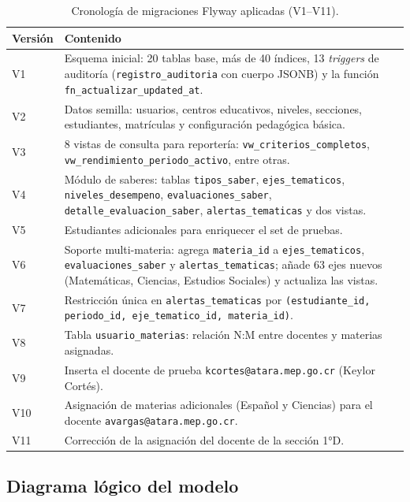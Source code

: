 \documentclass[11pt,a4paper,oneside]{article}
\newcommand{\code}[1]{\texttt{\small #1}}
\begin{document}
\begin{table}[h]
\centering
\renewcommand{\arraystretch}{1.15}
\begin{tabular}{@{}p{1.0cm} p{12.5cm}@{}}
\toprule
\textbf{Versión} & \textbf{Contenido} \\
\midrule
V1  & Esquema inicial: 20 tablas base, más de 40 índices, 13 \emph{triggers} de auditoría
       (\code{registro\_auditoria} con cuerpo JSONB) y la función
       \code{fn\_actualizar\_updated\_at}. \\
V2  & Datos semilla: usuarios, centros educativos, niveles, secciones, estudiantes,
       matrículas y configuración pedagógica básica. \\
V3  & 8 vistas de consulta para reportería:
       \code{vw\_criterios\_completos}, \code{vw\_rendimiento\_periodo\_activo},
       entre otras. \\
V4  & Módulo de saberes: tablas \code{tipos\_saber}, \code{ejes\_tematicos},
       \code{niveles\_desempeno}, \code{evaluaciones\_saber},
       \code{detalle\_evaluacion\_saber}, \code{alertas\_tematicas} y dos vistas. \\
V5  & Estudiantes adicionales para enriquecer el set de pruebas. \\
V6  & Soporte multi-materia: agrega \code{materia\_id} a \code{ejes\_tematicos},
       \code{evaluaciones\_saber} y \code{alertas\_tematicas}; añade 63 ejes nuevos
       (Matemáticas, Ciencias, Estudios Sociales) y actualiza las vistas. \\
V7  & Restricción única en \code{alertas\_tematicas} por
       \code{(estudiante\_id, periodo\_id, eje\_tematico\_id, materia\_id)}. \\
V8  & Tabla \code{usuario\_materias}: relación N:M entre docentes y materias asignadas. \\
V9  & Inserta el docente de prueba \code{kcortes@atara.mep.go.cr} (Keylor Cortés). \\
V10 & Asignación de materias adicionales (Español y Ciencias) para el docente
       \code{avargas@atara.mep.go.cr}. \\
V11 & Corrección de la asignación del docente de la sección 1°D. \\
\bottomrule
\end{tabular}
\caption{Cronología de migraciones Flyway aplicadas (V1–V11).}
\end{table}

\subsection{Diagrama lógico del modelo}
\end{document}
